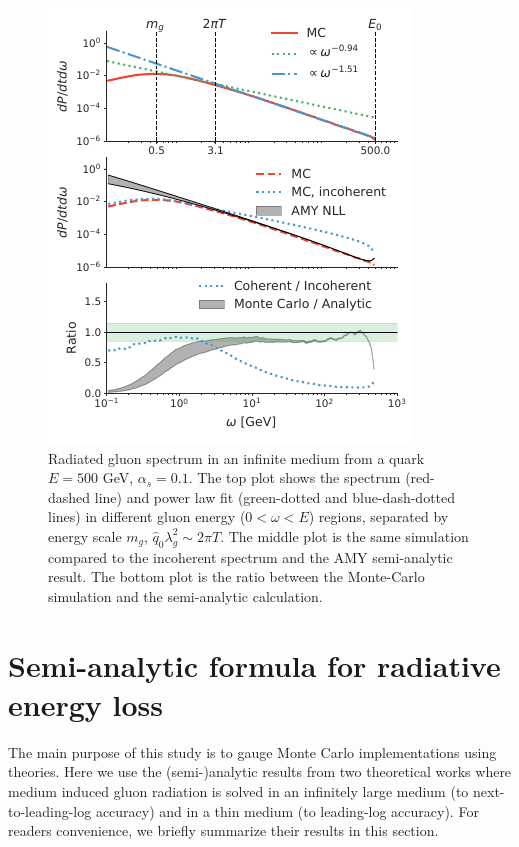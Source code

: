 \documentclass[aps, prc, reprint, amsmath, groupedaddress, nofootinbib]{revtex4-1}
\begin{document}
\begin{figure}
\includegraphics[width=\columnwidth]{spectrum.pdf}
\caption{Radiated gluon spectrum in an infinite medium from a quark $E=500$ GeV, $\alpha_s = 0.1$. The top plot shows the spectrum (red-dashed line) and power law fit (green-dotted and blue-dash-dotted lines) in different gluon energy ($0<\omega < E$) regions, separated by energy scale $m_g$, $\hat{q}_0\lambda_g^2 \sim 2\pi T$. The middle plot is the same simulation compared to the incoherent spectrum and the AMY semi-analytic result. The bottom plot is the ratio between the Monte-Carlo simulation and the semi-analytic calculation.}
\label{fig:spectrum}
\end{figure}
\section{Semi-analytic formula for radiative energy loss}\label{section:Theo}
The main purpose of this study is to gauge Monte Carlo implementations using theories.
Here we use the (semi-)analytic results from two theoretical works where medium induced gluon radiation is solved in an infinitely large medium (to next-to-leading-log accuracy) and in a thin medium (to leading-log accuracy).
For readers convenience, we briefly summarize their results in this section.
\end{document}
